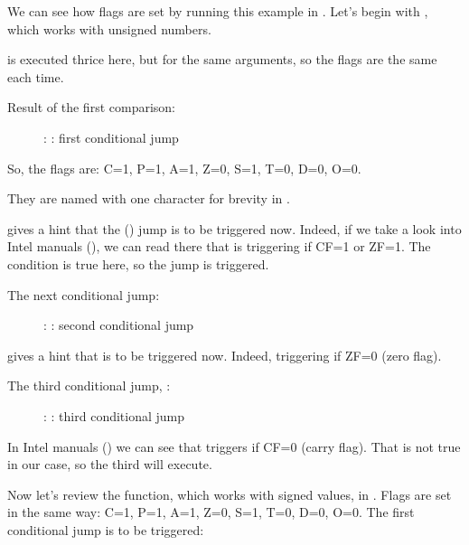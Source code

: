 \clearpage
{}
\myindex{\olly}

We can see how flags are set by running this example in \olly.
Let's begin with , which works with unsigned numbers.

\CMP is executed thrice here, but for the same arguments, so the flags are the same each time.

Result of the first comparison:

\begin{figure}[H]
\centering
{}
\caption{\olly: : first conditional jump}
\label{fig:jcc_olly_unsigned_1}
\end{figure}

So, the flags are: C=1, P=1, A=1, Z=0, S=1, T=0, D=0, O=0.

They are named with one character for brevity in \olly.

\olly gives a hint that the (\JBE) jump is to be triggered now.
Indeed, if we take a look into Intel manuals (), 
we can read there that \JBE is triggering if CF=1 or ZF=1.
The condition is true here, so the jump is triggered.

\clearpage
The next conditional jump:

\begin{figure}[H]
\centering
{}
\caption{\olly: : second conditional jump}
\label{fig:jcc_olly_unsigned_2}
\end{figure}

\olly gives a hint that \JNZ is to be triggered now.
Indeed, \JNZ triggering if ZF=0 (zero flag).

\clearpage
The third conditional jump, \JNB:

\begin{figure}[H]
\centering
{}
\caption{\olly: : third conditional jump}
\label{fig:jcc_olly_unsigned_3}
\end{figure}

In Intel manuals () we can see that \JNB triggers if CF=0 (carry flag).
That is not true in our case, so the third \printf will execute.

\clearpage
Now let's review the  function, which works with signed values, in \olly.
Flags are set in the same way: C=1, P=1, A=1, Z=0, S=1, T=0, D=0, O=0.
The first conditional jump \JLE is to be triggered:

